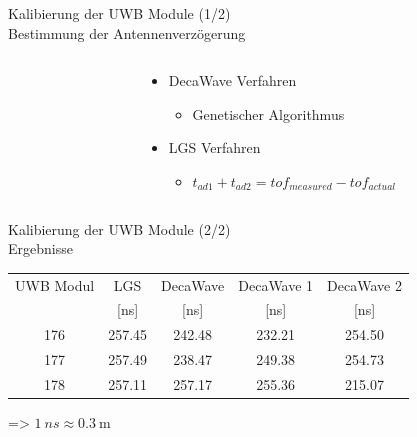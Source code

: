\documentclass{beamer}
\begin{document}
\begin{frame}{Kalibierung der UWB Module (1/2)\\\normalsize{Bestimmung der Antennenverzögerung}}
\begin{columns}
\begin{column}{0.5\linewidth}
\begin{overlayarea}{\linewidth}{.4\textheight}
{				}
			\end{overlayarea}
		\end{column}
		\begin{column}{0.5\linewidth}
			\begin{itemize}
				\item DecaWave Verfahren
					\begin{itemize}
						\item Genetischer Algorithmus
					\end{itemize}
				\item LGS Verfahren
					\begin{itemize}
						\item $t_{ad1} + t_{ad2} = tof_{measured} - tof_{actual}$
					\end{itemize}
			\end{itemize}
		\end{column}
	\end{columns}
\end{frame}


%
%


%
%
%
\begin{frame}{Kalibierung der UWB Module (2/2)\\\normalsize{Ergebnisse}}
	\centering
	\begin{table}
		\centering
		\begin{tabular}{||c||c||ccc||}
			\hline
			UWB Modul & LGS & DecaWave & DecaWave 1 & DecaWave 2 \\
			& [\si{\nano\second}] & [\si{\nano\second}] & [\si{\nano\second}] & [\si{\nano\second}] \\
			\hline
			\hline
			176 & \num{257.45} & \num{242.48} & \num{232.21} & \num{254.50} \\
			177 & \num{257.49} & \num{238.47} & \num{249.38} & \num{254.73} \\
			178 & \num{257.11} & \num{257.17} & \num{255.36} & \num{215.07} \\
			\hline
		\end{tabular}
	\end{table}
	\par\bigskip
	$\text{=> } \SI{1}{ns} \approx \SI{0.3}{\meter}$
\end{frame}
\end{document}
